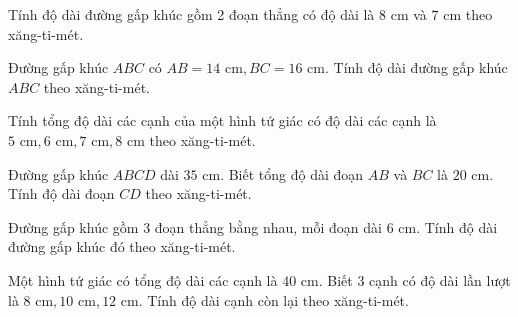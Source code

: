 \begin{ex} %
Tính độ dài đường gấp khúc gồm 2 đoạn thẳng có độ dài là $8\text{ cm}$ và $7\text{ cm}$ theo xăng-ti-mét.
\end{ex}

\begin{ex} %
Đường gấp khúc $ABC$ có $AB = 14\text{ cm}, BC = 16\text{ cm}$. Tính độ dài đường gấp khúc $ABC$ theo xăng-ti-mét.
\end{ex}

\begin{ex} %
Tính tổng độ dài các cạnh của một hình tứ giác có độ dài các cạnh là $5\text{ cm}, 6\text{ cm}, 7\text{ cm}, 8\text{ cm}$ theo xăng-ti-mét.
\end{ex}

\begin{ex} %
Đường gấp khúc $ABCD$ dài $35\text{ cm}$. Biết tổng độ dài đoạn $AB$ và $BC$ là $20\text{ cm}$. Tính độ dài đoạn $CD$ theo xăng-ti-mét.
\end{ex}

\begin{ex} %
Đường gấp khúc gồm 3 đoạn thẳng bằng nhau, mỗi đoạn dài $6\text{ cm}$. Tính độ dài đường gấp khúc đó theo xăng-ti-mét.
\end{ex}

\begin{ex} %
Một hình tứ giác có tổng độ dài các cạnh là $40\text{ cm}$. Biết 3 cạnh có độ dài lần lượt là $8\text{ cm}, 10\text{ cm}, 12\text{ cm}$. Tính độ dài cạnh còn lại theo xăng-ti-mét.
\end{ex}
